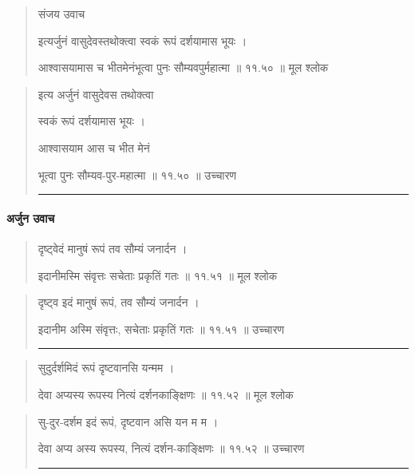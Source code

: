 \begin{quotation} 

संजय उवाच

इत्यर्जुनं वासुदेवस्तथोक्त्वा स्वकं रूपं दर्शयामास भूयः  ।  

आश्वासयामास च भीतमेनंभूत्वा पुनः सौम्यवपुर्महात्मा  ॥ ११.५० ॥  मूल श्लोक
\end{quotation}

\begin{quotation}

इत्य अर्जुनं वासुदेवस तथोक्त्वा 

स्वकं रूपं दर्शयामास भूयः  ।  

आश्वासयाम आस च भीत मेनं 

भूत्वा पुनः सौम्यव-पुर-महात्मा  ॥ ११.५० ॥  उच्चारण

\noindent\rule{16cm}{0.4pt} 
\end{quotation}



\paragraph{\sanskrit अर्जुन उवाच}
\begin{quotation} 
दृष्ट्वेदं मानुषं रूपं तव सौम्यं जनार्दन  ।  

इदानीमस्मि संवृत्तः सचेताः प्रकृतिं गतः  ॥ ११.५१ ॥  मूल श्लोक
\end{quotation}

\begin{quotation}

दृष्ट्व इदं मानुषं रूपं, तव सौम्यं जनार्दन  ।  

इदानीम अस्मि संवृत्तः, सचेताः प्रकृतिं गतः  ॥ ११.५१ ॥  उच्चारण

\noindent\rule{16cm}{0.4pt} 
\end{quotation}


\begin{quotation} 

सुदुर्दर्शमिदं रूपं दृष्टवानसि यन्मम  ।  

देवा अप्यस्य रूपस्य नित्यं दर्शनकाङ्‍क्षिणः  ॥ ११.५२ ॥  मूल श्लोक
\end{quotation}

\begin{quotation}
सु-दुर-दर्शम इदं रूपं, दृष्टवान असि यन म म ।  

देवा अप्य अस्य रूपस्य, नित्यं दर्शन-काङ्‍क्षिणः  ॥ ११.५२ ॥  उच्चारण

\noindent\rule{16cm}{0.4pt} 
\end{quotation}


